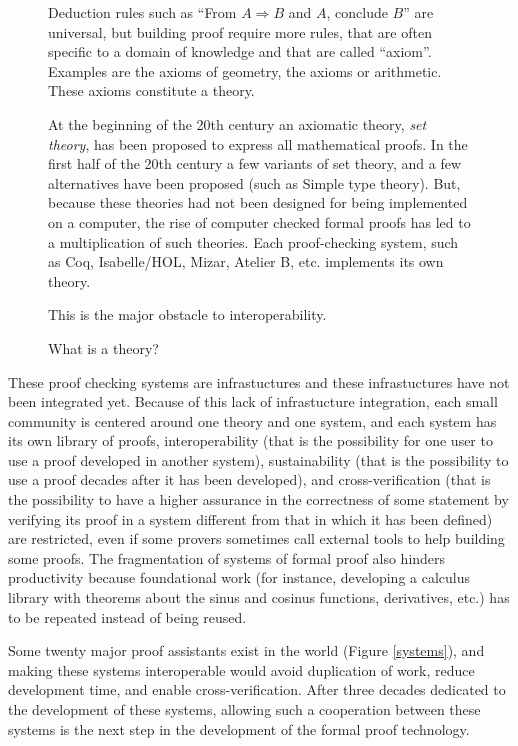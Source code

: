 \begin{figure}
\begin{framed}
Deduction rules such as ``From $A \Rightarrow B$ and $A$, conclude
$B$'' are universal, but building proof require more rules,
that are often specific to a domain of knowledge and that are called
``axiom''. Examples are the axioms of geometry, the axioms or
arithmetic. These axioms constitute a theory.

At the beginning of the 20th century an axiomatic theory, {\em set
  theory}, has been proposed to express all mathematical proofs. In
the first half of the 20th century a few variants of set theory, and a
few alternatives have been proposed (such as Simple type theory).
But, because these theories had not been designed for being
implemented on a computer, the rise of computer checked formal proofs
has led to a multiplication of such theories. Each proof-checking
system, such as {\sc Coq}, {\sc Isabelle/HOL}, {\sc Mizar}, {\sc
  Atelier B}, etc. implements its own theory.

This is the major obstacle to interoperability.
\caption{What is a theory?\label{theory}}
\end{framed}
\end{figure}

These proof checking systems are infrastuctures and these infrastuctures
have not been integrated yet.
Because of this lack of infrastucture integration, each small
community is centered around one theory and one system, and each
system has its own library of proofs, interoperability (that is the
possibility for one user to use a proof developed in another system),
sustainability (that is the possibility to use a proof decades after
it has been developed), and cross-verification (that is the
possibility to have a higher assurance in the correctness of some
statement by verifying its proof in a system different from that in
which it has been defined) are restricted, even if some provers
sometimes call external tools to help building some proofs. The
fragmentation of systems of formal proof also hinders productivity
because foundational work (for instance, developing a calculus library
with theorems about the sinus and cosinus functions, derivatives,
etc.) has to be repeated instead of being reused.

Some twenty major proof assistants exist in the world (Figure
\ref{systems}), and making these systems interoperable would avoid
duplication of work, reduce development time, and enable
cross-verification.  After three decades dedicated to the development
of these systems, allowing such a cooperation between these systems is
the next step in the development of the formal proof technology.

